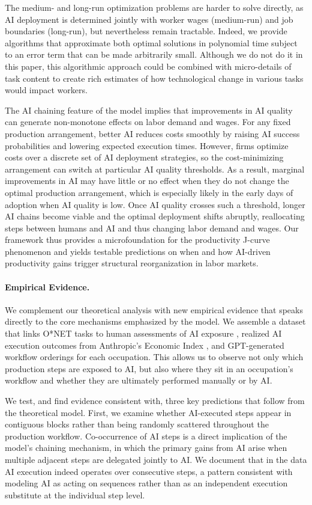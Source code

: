 The medium- and long-run optimization problems are harder to solve directly, as AI deployment is determined jointly with worker wages (medium-run) and job boundaries (long-run), but nevertheless remain tractable.
Indeed, we provide algorithms that approximate both optimal solutions in polynomial time subject to an error term that can be made arbitrarily small.
Although we do not do it in this paper, this algorithmic approach could be combined with micro-details of task content to create rich estimates of how technological change in various tasks would impact workers.

The AI chaining feature of the model implies that improvements in AI quality can generate non-monotone effects on labor demand and wages.
For any fixed production arrangement, better AI reduces costs smoothly by raising AI success probabilities and lowering expected execution times.
However, firms optimize costs over a discrete set of AI deployment strategies, so the cost-minimizing arrangement can switch at particular AI quality thresholds.
As a result, marginal improvements in AI may have little or no effect when they do not change the optimal production arrangement, which is especially likely in the early days of adoption when AI quality is low.
Once AI quality crosses such a threshold, longer AI chains become viable and the optimal deployment shifts abruptly, reallocating steps between humans and AI and thus changing labor demand and wages.
Our framework thus provides a microfoundation for the productivity J-curve phenomenon \citep{brynjolfsson2021productivity} and yields testable predictions on when and how AI-driven productivity gains trigger structural reorganization in labor markets.


\paragraph{Empirical Evidence.}
We complement our theoretical analysis with new empirical evidence that speaks directly to the core mechanisms emphasized by the model.
We assemble a dataset that links O*NET tasks to human assessments of AI exposure \citep{eloundou2023gpts}, realized AI execution outcomes from Anthropic's Economic Index \citep{handa2025economictasksperformedai}, and GPT-generated workflow orderings for each occupation.
This allows us to observe not only which production steps are exposed to AI, but also where they sit in an occupation's workflow and whether they are ultimately performed manually or by AI.

We test, and find evidence consistent with, three key predictions that follow from the theoretical model.
First, we examine whether AI-executed steps appear in contiguous blocks rather than being randomly scattered throughout the production workflow.
Co-occurrence of AI steps is a direct implication of the model's chaining mechanism, in which the primary gains from AI arise when multiple adjacent steps are delegated jointly to AI.
We document that in the data AI execution indeed operates over consecutive steps, a pattern consistent with modeling AI as acting on sequences rather than as an independent execution substitute at the individual step level.


